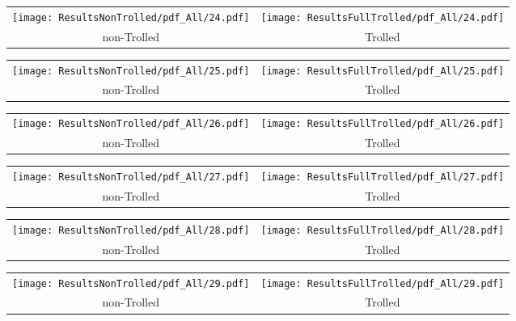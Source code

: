 \begin{tabular}{cc}
{  \texttt{[image: ResultsNonTrolled/pdf\_All/24.pdf]} } & 
{  \texttt{[image: ResultsFullTrolled/pdf\_All/24.pdf]}} \\
 non-Trolled & Trolled \\
\end{tabular}

\begin{tabular}{cc}
{  \texttt{[image: ResultsNonTrolled/pdf\_All/25.pdf]} } & 
{  \texttt{[image: ResultsFullTrolled/pdf\_All/25.pdf]}} \\
 non-Trolled & Trolled \\
\end{tabular}

\begin{tabular}{cc}
{  \texttt{[image: ResultsNonTrolled/pdf\_All/26.pdf]} } & 
{  \texttt{[image: ResultsFullTrolled/pdf\_All/26.pdf]}} \\
 non-Trolled & Trolled \\
\end{tabular}

\begin{tabular}{cc}
{  \texttt{[image: ResultsNonTrolled/pdf\_All/27.pdf]} } & 
{  \texttt{[image: ResultsFullTrolled/pdf\_All/27.pdf]}} \\
 non-Trolled & Trolled \\
\end{tabular}

\begin{tabular}{cc}
{  \texttt{[image: ResultsNonTrolled/pdf\_All/28.pdf]} } & 
{  \texttt{[image: ResultsFullTrolled/pdf\_All/28.pdf]}} \\
 non-Trolled & Trolled \\
\end{tabular}

\begin{tabular}{cc}
{  \texttt{[image: ResultsNonTrolled/pdf\_All/29.pdf]} } & 
{  \texttt{[image: ResultsFullTrolled/pdf\_All/29.pdf]}} \\
 non-Trolled & Trolled \\
\end{tabular}

